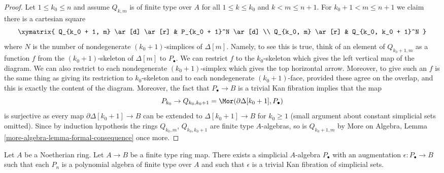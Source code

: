 \begin{proof}
\medskip\noindent
Let $1 \leq k_0 \leq n$ and assume $Q_{k, m}$ is of finite type
over $A$ for all $1 \leq k \leq k_0$ and $k < m \leq n + 1$.
For $k_0 + 1 < m \leq n + 1$ we claim there is a cartesian square
$$
\xymatrix{
Q_{k_0 + 1, m} \ar[d] \ar[r] & P_{k_0 + 1}^N \ar[d] \\
Q_{k_0, m} \ar[r] & Q_{k_0, k_0 + 1}^N
}
$$
where $N$ is the number of nondegenerate $(k_0 + 1)$-simplices
of $\Delta[m]$. Namely, to see this is true, think of an element of
$Q_{k_0 + 1, m}$ as a function $f$ from the $(k_0 + 1)$-skeleton
of $\Delta[m]$ to $P_\bullet$. We can restrict $f$ to the $k_0$-skeleton
which gives the left vertical map of the diagram. We can also restrict
to each nondegenerate $(k_0 + 1)$-simplex which gives the top horizontal
arrow. Moreover, to give such an $f$ is the same thing as giving its
restriction to $k_0$-skeleton and to each nondegenerate
$(k_0 + 1)$-face, provided these agree on the overlap, and this
is exactly the content of the diagram. Moreover, the fact that
$P_\bullet \to B$ is a trivial Kan fibration implies that
the map
$$
P_{k_0} \to Q_{k_0, k_0 + 1} = \Mor(\partial \Delta[k_0 + 1], P_\bullet)
$$
is surjective as every map $\partial \Delta[k_0 + 1] \to B$ can be extended
to $\Delta[k_0 + 1] \to B$ for $k_0 \geq 1$ (small argument about constant
simplicial sets omitted). Since by induction hypothesis the rings
$Q_{k_0, m}$, $Q_{k_0, k_0 + 1}$ are finite type $A$-algebras, so is
$Q_{k_0 + 1, m}$ by
More on Algebra, Lemma \ref{more-algebra-lemma-formal-consequence}
once more.
\end{proof}

\begin{proposition}
\label{proposition-polynomial}
Let $A$ be a Noetherian ring. Let $A \to B$ be a finite type ring map.
There exists a simplicial $A$-algebra $P_\bullet$ with an augmentation
$\epsilon : P_\bullet \to B$ such that each $P_n$ is a polynomial algebra
of finite type over $A$ and such that $\epsilon$ is a trivial
Kan fibration of simplicial sets.
\end{proposition}


